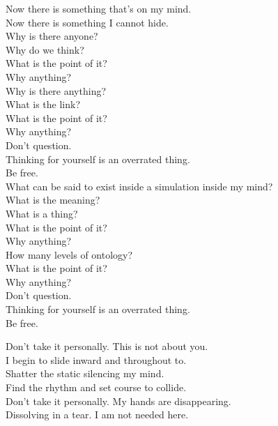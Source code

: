 Now there is something that's on my mind. \\
Now there is something I cannot hide. \\
Why is there anyone? \\
Why do we think? \\
What is the point of it? \\
Why anything? \\
Why is there anything? \\
What is the link? \\
What is the point of it? \\
Why anything? \\

Don't question. \\
Thinking for yourself is an overrated thing. \\
Be free. \\

What can be said to exist inside a simulation inside my mind? \\
What is the meaning? \\
What is a thing? \\
What is the point of it? \\
Why anything? \\
How many levels of ontology? \\
What is the point of it? \\
Why anything? \\

Don't question. \\
Thinking for yourself is an overrated thing. \\
Be free. \\




Don't take it personally. This is not about you. \\
I begin to slide inward and throughout to. \\
Shatter the static silencing my mind. \\
Find the rhythm and set course to collide. \\

Don't take it personally. My hands are disappearing. \\
Dissolving in a tear. I am not needed here. \\

